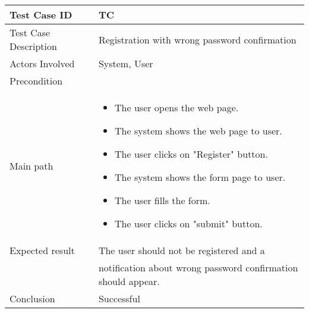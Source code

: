 \begin{center} \begin{tabular}{|l|l|}
  \hline
  Test Case ID & TC \z\\
  \hline
  Test Case Description & Registration with wrong password confirmation\\
  \hline
  Actors Involved & System, User\\
   \hline
  Precondition & \\
  \hline
  Main path &   \begin{minipage}{5in}
    \vskip 4pt
            \begin{itemize}
              \item The user opens the web page.
              \item The system shows the web page to user.
              \item The user clicks on "Register" button.
              \item The system shows the form page to user.
              \item The user fills the form.
              \item The user clicks on "submit" button.
            \end{itemize}
    \vskip 4pt
  \end{minipage}  \\
  \hline
  Expected result & The user should not be registered and a\\
  & notification about wrong password confirmation should appear.  \\
  \hline
  Conclusion & Successful \\
  \hline
\end{tabular} \end{center}

